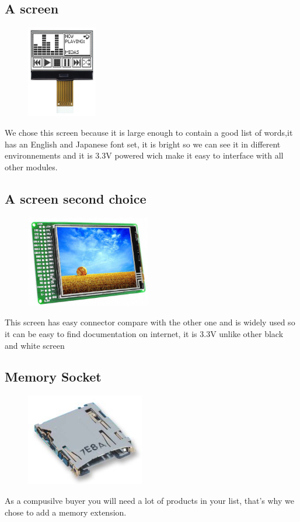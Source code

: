 \documentclass[12pt,a4paper,landscape]{article}
\begin{document}
\begin{multicols}{2}
	\subsection*{A screen}
			\begin{figure}[H]
			\centering
			\includegraphics[height=4cm]{images/screen.png}
			\end{figure}
			We chose this screen because it is large enough to contain a good list of words,it has an English and Japanese font set, it is bright so we can see it in different environnements and it is 3.3V powered wich make it easy to interface with all other modules.

	\subsection*{A screen second choice}
			\begin{figure}[H]
			\centering
			\includegraphics[height=4cm]{images/screen2.png}
			\end{figure}
			This screen has easy connector compare with the other one and is widely used so it can be easy to find documentation on internet, it is 3.3V unlike other black and white screen

	\subsection*{Memory Socket}
			\begin{figure}[H]
			\centering
			\includegraphics[height=4cm]{images/memory_socket.png}
			\end{figure}
			As a compusilve buyer you will need a lot of products in your list, that's why we chose to add a memory extension.


\end{multicols}
\end{document}
